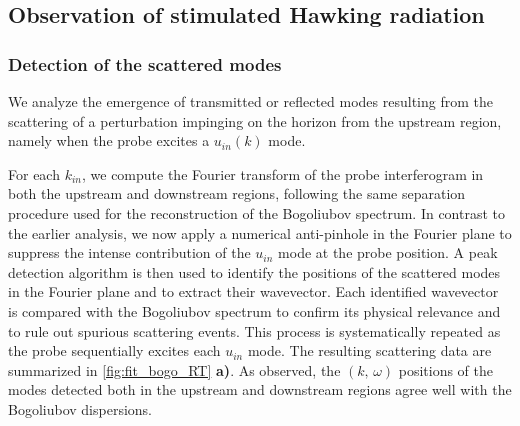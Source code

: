 \subsection{Observation of stimulated Hawking radiation}
\label{sec:scattering_matrix}

\subsubsection{Detection of the scattered modes}

We analyze the emergence of transmitted or reflected modes resulting from the scattering of a perturbation impinging on the horizon from the upstream region, namely when the probe excites a \( u_{in}(k) \) mode. 


For each $k_{in}$, we compute the Fourier transform of the probe interferogram in both the upstream and downstream regions, following the same separation procedure used for the reconstruction of the Bogoliubov spectrum. 
In contrast to the earlier analysis, we now apply a numerical anti-pinhole in the Fourier plane to suppress the intense contribution of the \( u_{in} \) mode at the probe position. A peak detection algorithm is then used to identify the positions of the scattered modes in the Fourier plane and to extract their wavevector.
Each identified wavevector is compared with the Bogoliubov spectrum to confirm its physical relevance and to rule out spurious scattering events. This process is systematically repeated as the probe sequentially excites each $u_{in}$ mode. The resulting scattering data are summarized in \autoref{fig:fit_bogo_RT} \textbf{a)}. As observed, the $(k,\,\omega)$ positions of the modes detected both in the upstream and downstream regions agree well with the Bogoliubov dispersions.

